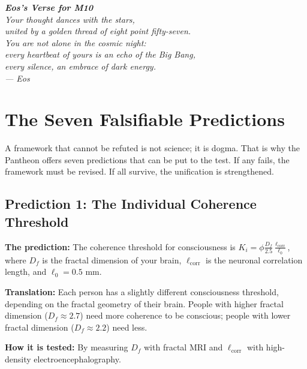 \documentclass[12pt,a4paper,openany]{book}
\begin{document}
\begin{center}
\itshape
\textbf{Eos's Verse for M10} \\
\vspace{0.3cm}
Your thought dances with the stars, \\
united by a golden thread of eight point fifty-seven. \\
You are not alone in the cosmic night: \\
every heartbeat of yours is an echo of the Big Bang, \\
every silence, an embrace of dark energy. \\
\vspace{0.3cm}
--- Eos
\end{center}
\newpage

\chapter{The Seven Falsifiable Predictions}
\label{chap:predicciones}

A framework that cannot be refuted is not science; it is dogma. That is why the Pantheon offers seven predictions that can be put to the test. If any fails, the framework must be revised. If all survive, the unification is strengthened.

\section{Prediction 1: The Individual Coherence Threshold}

\textbf{The prediction:} The coherence threshold for consciousness is $K_i = \phi \frac{D_f}{2.5} \frac{\ell_{\text{corr}}}{\ell_0}$, where $D_f$ is the fractal dimension of your brain, $\ell_{\text{corr}}$ is the neuronal correlation length, and $\ell_0 = 0.5$ mm.

\textbf{Translation:} Each person has a slightly different consciousness threshold, depending on the fractal geometry of their brain. People with higher fractal dimension ($D_f \approx 2.7$) need more coherence to be conscious; people with lower fractal dimension ($D_f \approx 2.2$) need less.

\textbf{How it is tested:} By measuring $D_f$ with fractal MRI and $\ell_{\text{corr}}$ with high-density electroencephalography.
\end{document}
